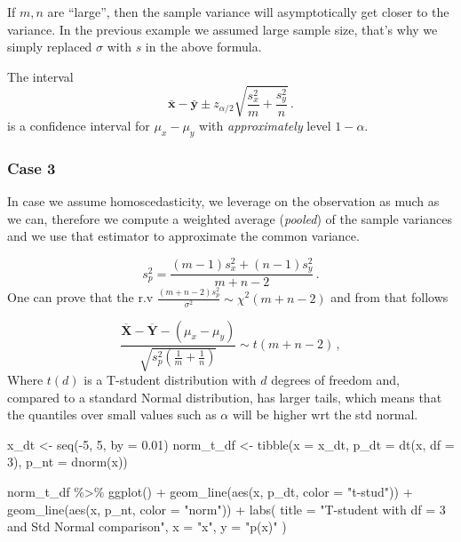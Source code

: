 \documentclass[
  oneside]{book}
\newenvironment{Shaded}{\begin{snugshade}}{\end{snugshade}}
\newcommand{\AttributeTok}[1]{\textcolor[rgb]{0.77,0.63,0.00}{#1}}
\newcommand{\DecValTok}[1]{\textcolor[rgb]{0.00,0.00,0.81}{#1}}
\newcommand{\FloatTok}[1]{\textcolor[rgb]{0.00,0.00,0.81}{#1}}
\newcommand{\FunctionTok}[1]{\textcolor[rgb]{0.00,0.00,0.00}{#1}}
\newcommand{\NormalTok}[1]{#1}
\newcommand{\OtherTok}[1]{\textcolor[rgb]{0.56,0.35,0.01}{#1}}
\newcommand{\SpecialCharTok}[1]{\textcolor[rgb]{0.00,0.00,0.00}{#1}}
\newcommand{\StringTok}[1]{\textcolor[rgb]{0.31,0.60,0.02}{#1}}
\begin{document}
If \(m, n\) are ``large'', then the sample variance will asymptotically get
closer to the variance. In the previous example we assumed large sample
size, that's why we simply replaced \(\sigma\) with \(s\) in the above formula.

The interval
\[
\bar{\mathbf{x}} - \bar{\mathbf{y}} \pm z_{\alpha/2}\sqrt{\frac{s_x^2}{m} +
\frac{s_y^2}{n}}\,.
\]
is a confidence interval for \(\mu_x - \mu_y\) with \emph{approximately} level \(1-\alpha\).

\hypertarget{case-3}{%
\subsubsection{Case 3}\label{case-3}}

In case we assume homoscedasticity, we leverage on the observation as much as we
can, therefore we compute a weighted average (\emph{pooled}) of the sample variances
and we use that estimator to approximate the common variance.

\[
s_p^2 = \frac{(m - 1) s_x^2 + (n - 1) s_y^2}{m + n - 2}\,.
\]
One can prove that the r.v
\(\frac{(m + n - 2) s_p^2}{\sigma^2} \sim \chi^2(m + n - 2)\) and from that
follows

\[
\frac{\overline{\mathbf X} - \overline{\mathbf Y} - (\mu_x -
\mu_y)}{\sqrt{s_p^2 \left( \frac{1}{m} +
\frac{1}{n}\right)}} \sim t(m + n - 2)\,,
\]
Where \(t(d)\) is a T-student distribution with \(d\) degrees of freedom and,
compared to a standard Normal distribution, has larger tails, which means that
the quantiles over small values such as \(\alpha\) will be higher wrt the std
normal.

\begin{Shaded}
\begin{Highlighting}[]
\NormalTok{x\_dt }\OtherTok{\textless{}{-}} \FunctionTok{seq}\NormalTok{(}\SpecialCharTok{{-}}\DecValTok{5}\NormalTok{, }\DecValTok{5}\NormalTok{, }\AttributeTok{by =} \FloatTok{0.01}\NormalTok{)}
\NormalTok{norm\_t\_df }\OtherTok{\textless{}{-}} \FunctionTok{tibble}\NormalTok{(}\AttributeTok{x =}\NormalTok{ x\_dt, }\AttributeTok{p\_dt =} \FunctionTok{dt}\NormalTok{(x, }\AttributeTok{df =} \DecValTok{3}\NormalTok{), }\AttributeTok{p\_nt =} \FunctionTok{dnorm}\NormalTok{(x))}

\NormalTok{norm\_t\_df }\SpecialCharTok{\%\textgreater{}\%}
  \FunctionTok{ggplot}\NormalTok{() }\SpecialCharTok{+}
  \FunctionTok{geom\_line}\NormalTok{(}\FunctionTok{aes}\NormalTok{(x, p\_dt, }\AttributeTok{color =} \StringTok{"t{-}stud"}\NormalTok{)) }\SpecialCharTok{+}
  \FunctionTok{geom\_line}\NormalTok{(}\FunctionTok{aes}\NormalTok{(x, p\_nt, }\AttributeTok{color =} \StringTok{"norm"}\NormalTok{)) }\SpecialCharTok{+}
  \FunctionTok{labs}\NormalTok{(}
    \AttributeTok{title =} \StringTok{"T{-}student with df = 3 and Std Normal comparison"}\NormalTok{,}
    \AttributeTok{x =} \StringTok{"x"}\NormalTok{, }\AttributeTok{y =} \StringTok{"p(x)"}
\NormalTok{  )}
\end{Highlighting}
\end{Shaded}
\end{document}
